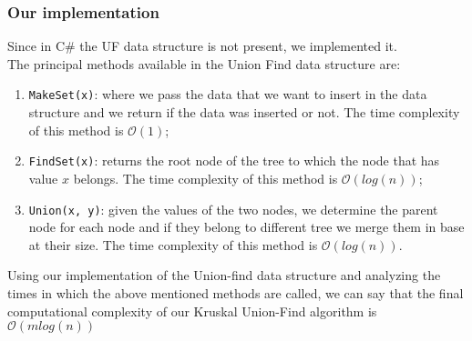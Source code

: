 \subsubsection{Our implementation}
Since in C\# the UF data structure is not present, we implemented it.\\
The principal methods available in the Union Find data structure are:
\begin{enumerate}
    \item \verb|MakeSet(x)|: where we pass the data that we want to insert in the data structure and we return 
        if the data was inserted or not. The time complexity of this method is $\mathcal{O}(1)$;
    \item \verb|FindSet(x)|: returns the root node of the tree to which the node that has value $x$ belongs.
        The time complexity of this method is $\mathcal{O}(log(n))$;
    \item \verb|Union(x, y)|: given the values of the two nodes, we determine the parent node for each node and 
        if they belong to different tree we merge them in base at their size. The time complexity of this 
        method is $\mathcal{O}(log(n))$.
\end{enumerate}
\noindent
Using our implementation of the Union-find data structure and analyzing the times in which the above mentioned methods are called, 
we can say that the final computational complexity of our Kruskal Union-Find algorithm is $\mathcal{O}(m log(n))$

